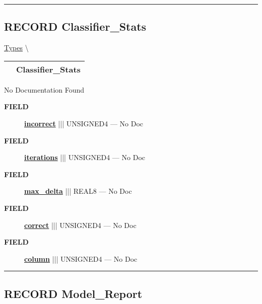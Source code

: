 \rule{\linewidth}{0.5pt}
\subsection*{\textsf{\colorbox{headtoc}{\color{white} RECORD}
Classifier\_Stats}}

\hypertarget{ecldoc:logisticregression.types.classifier_stats}{}
\hspace{0pt} \hyperlink{ecldoc:LogisticRegression.Types}{Types} \textbackslash 

{\renewcommand{\arraystretch}{1.5}
\begin{tabularx}{\textwidth}{|>{\raggedright\arraybackslash}l|X|}
\hline
\hspace{0pt}\mytexttt{\color{red} } & \textbf{Classifier\_Stats} \\
\hline
\end{tabularx}
}

\par





No Documentation Found







\par
\begin{description}
\item [\colorbox{tagtype}{\color{white} \textbf{\textsf{FIELD}}}] \textbf{\underline{incorrect}} ||| UNSIGNED4 --- No Doc
\item [\colorbox{tagtype}{\color{white} \textbf{\textsf{FIELD}}}] \textbf{\underline{iterations}} ||| UNSIGNED4 --- No Doc
\item [\colorbox{tagtype}{\color{white} \textbf{\textsf{FIELD}}}] \textbf{\underline{max\_delta}} ||| REAL8 --- No Doc
\item [\colorbox{tagtype}{\color{white} \textbf{\textsf{FIELD}}}] \textbf{\underline{correct}} ||| UNSIGNED4 --- No Doc
\item [\colorbox{tagtype}{\color{white} \textbf{\textsf{FIELD}}}] \textbf{\underline{column}} ||| UNSIGNED4 --- No Doc
\end{description}





\rule{\linewidth}{0.5pt}
\subsection*{\textsf{\colorbox{headtoc}{\color{white} RECORD}
Model\_Report}}


